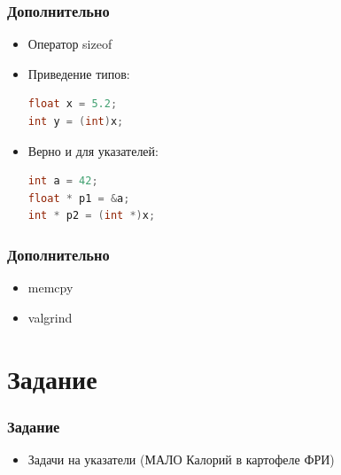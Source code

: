 \documentclass[12pt,pdf,hyperref={unicode}]{beamer}
\begin{document}
\begin{frame}[fragile]
\frametitle{Дополнительно} 
\begin{itemize}
\item Оператор sizeof \\
\item Приведение типов: \\
\begin{lstlisting}[language=C++,basicstyle=\ttfamily,keywordstyle=\color{blue}]
float x = 5.2;
int y = (int)x;
\end{lstlisting}
\item Верно и для указателей: \\
\begin{lstlisting}[language=C++,basicstyle=\ttfamily,keywordstyle=\color{blue}]
int a = 42;
float * p1 = &a;
int * p2 = (int *)x;
\end{lstlisting}
\end{itemize}
\end{frame}



\begin{frame}[fragile]
\frametitle{Дополнительно} 
\begin{itemize}
\item memcpy \\
\item valgrind \\
\end{itemize}
\end{frame}





\section{Задание}


\begin{frame}[fragile]
\frametitle{Задание} 
\begin{itemize}
\item Задачи на указатели (МАЛО Калорий в картофеле ФРИ)
\end{itemize}
\end{frame}
\end{document}
